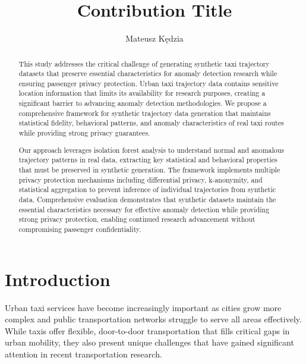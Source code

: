 \documentclass[runningheads]{llncs}
\begin{document}

\title{Contribution Title}
\author{Mateusz Kędzia}
\maketitle

\begin{abstract}
This study addresses the critical challenge of generating synthetic taxi trajectory datasets that preserve essential characteristics for anomaly detection research while ensuring passenger privacy protection. Urban taxi trajectory data contains sensitive location information that limits its availability for research purposes, creating a significant barrier to advancing anomaly detection methodologies. We propose a comprehensive framework for synthetic trajectory data generation that maintains statistical fidelity, behavioral patterns, and anomaly characteristics of real taxi routes while providing strong privacy guarantees.

Our approach leverages isolation forest analysis to understand normal and anomalous trajectory patterns in real data, extracting key statistical and behavioral properties that must be preserved in synthetic generation. The framework implements multiple privacy protection mechanisms including differential privacy, k-anonymity, and statistical aggregation to prevent inference of individual trajectories from synthetic data. Comprehensive evaluation demonstrates that synthetic datasets maintain the essential characteristics necessary for effective anomaly detection while providing strong privacy protection, enabling continued research advancement without compromising passenger confidentiality.

\end{abstract}

\newpage


\section{Introduction}
\label{sec:introduction}

Urban taxi services have become increasingly important as cities grow more complex and public transportation networks struggle to serve all areas effectively. While taxis offer flexible, door-to-door transportation that fills critical gaps in urban mobility, they also present unique challenges that have gained significant attention in recent transportation research.
\end{document}
